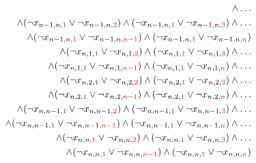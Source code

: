 \documentclass[11pt, a4paper]{article}
\begin{document}
\begin{align*}
	\wedge \dots \\
	\wedge
	(\neg x_{n-1,n,{\color{red} 1}} \vee \neg x_{n-1,n,{\color{red} 2}}) 
	\wedge 
	(\neg x_{n-1,n,{\color{red} 1}} \vee \neg x_{n-1,n,{\color{red} 3}})
	\wedge \dots \\
	\wedge
	(\neg x_{n-1,n,{\color{red} 1}} \vee \neg x_{n-1,n,{\color{red} n-1}})
	\wedge
	(\neg x_{n-1,n,{\color{red} 1}} \vee \neg x_{n-1,n,{\color{red} n}})
	\\
	\wedge (\neg x_{n,1,{\color{red} 1}} \vee \neg x_{n,1,{\color{red} 2}}) 
	\wedge 
	(\neg x_{n,1,{\color{red} 1}} \vee \neg x_{n,1,{\color{red} 3}})
	\wedge \dots \\
	\wedge
	(\neg x_{n,1,{\color{red} 1}} \vee \neg x_{n,1,{\color{red} n-1}})
	\wedge
	(\neg x_{n,1,{\color{red} 1}} \vee \neg x_{n,1,{\color{red} n}})
	\wedge \dots \\
	\wedge
	(\neg x_{n,2,{\color{red} 1}} \vee \neg x_{n,2,{\color{red} 2}}) 
	\wedge 
	(\neg x_{n,2,{\color{red} 1}} \vee \neg x_{n,2,{\color{red} 3}})
	\wedge \dots \\
	\wedge
	(\neg x_{n,2,{\color{red} 1}} \vee \neg x_{n,2,{\color{red} n-1}})
	\wedge
	(\neg x_{n,2,{\color{red} 1}} \vee \neg x_{n,2,{\color{red} n}})
	\wedge \dots \\
	\wedge
	(\neg x_{n,n-1,{\color{red} 1}} \vee \neg x_{n,n-1,{\color{red} 2}}) 
	\wedge 
	(\neg x_{n,n-1,{\color{red} 1}} \vee \neg x_{n,n-1,{\color{red} 3}})
	\wedge \dots \\
	\wedge
	(\neg x_{n,n-1,{\color{red} 1}} \vee \neg x_{n,n-1,{\color{red} n-1}})
	\wedge
	(\neg x_{n,n-1,{\color{red} 1}} \vee \neg x_{n,n-1,{\color{red} n}})
	\wedge \dots \\
	\wedge
	(\neg x_{n,n,{\color{red} 1}} \vee \neg x_{n,n,{\color{red} 2}}) 
	\wedge 
	(\neg x_{n,n,{\color{red} 1}} \vee \neg x_{n,n,{\color{red} 3}})
	\wedge \dots \\
	\wedge
	(\neg x_{n,n,{\color{red} 1}} \vee \neg x_{n,n,{\color{red} n-1}})
	\wedge
	(\neg x_{n,n,{\color{red} 1}} \vee \neg x_{n,n,{\color{red} n}})
	\end{align*}
	
\end{document}
